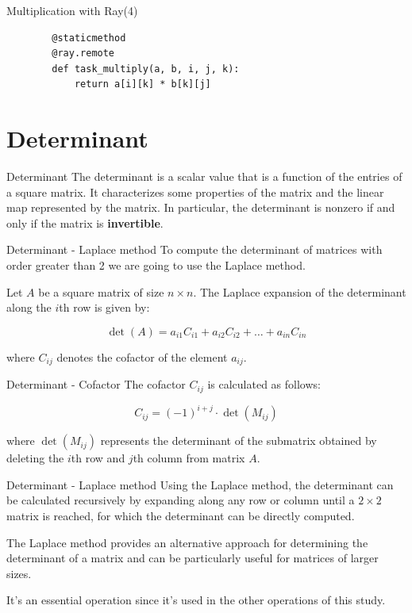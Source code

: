 \documentclass{beamer}
\begin{document}
\begin{frame}[fragile]{Multiplication with Ray(4)}
    \begin{verbatim}
        @staticmethod
        @ray.remote
        def task_multiply(a, b, i, j, k):
            return a[i][k] * b[k][j]
    \end{verbatim}
\end{frame}

\section{Determinant}
\begin{frame}{Determinant}
    The \alert{determinant} is a scalar value that is a function of the entries of a square matrix. It characterizes some properties of the matrix and the linear map represented by the matrix. In particular, the determinant is nonzero if and only if the matrix is \textbf{invertible}.

\end{frame}

\begin{frame}{Determinant - Laplace method}
    To compute the determinant of matrices with order greater than 2 we are going to use the \alert{Laplace method}.


    Let $A$ be a square matrix of size $n \times n$. The Laplace expansion of the determinant along the $i$th row is given by:

    $$
        \det(A) = a_{i1} C_{i1} + a_{i2} C_{i2} + \ldots + a_{in} C_{in}
    $$

    where $C_{ij}$ denotes the cofactor of the element $a_{ij}$.
\end{frame}

\begin{frame}{Determinant - Cofactor}
    The \alert{cofactor} $C_{ij}$ is calculated as follows:

    $$
        C_{ij} = (-1)^{i+j} \cdot \det(M_{ij})
    $$

    where $\det(M_{ij})$ represents the determinant of the submatrix obtained by deleting the $i$th row and $j$th column from matrix $A$.
\end{frame}

\begin{frame}{Determinant - Laplace method}
    Using the Laplace method, the determinant can be calculated recursively by expanding along any row or column until a $2 \times 2$ matrix is reached, for which the determinant can be directly computed.

    The Laplace method provides an alternative approach for determining the determinant of a matrix and can be particularly useful for matrices of larger sizes.

    It's an essential operation since it's used in the other operations of this study.
\end{frame}
\end{document}
